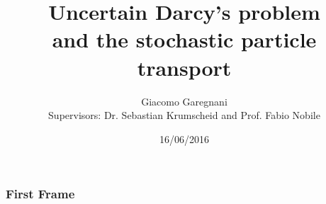 \documentclass{beamer}
\title{Uncertain Darcy's problem \\ and the stochastic particle transport}
\author{Giacomo Garegnani \\ {Supervisors: Dr. Sebastian Krumscheid and Prof. Fabio Nobile}}
\institute{EPFL}
\date{16/06/2016}
\begin{document}
\frame{\titlepage}

\begin{frame}
\frametitle{First Frame}
\end{frame}
\end{document}
